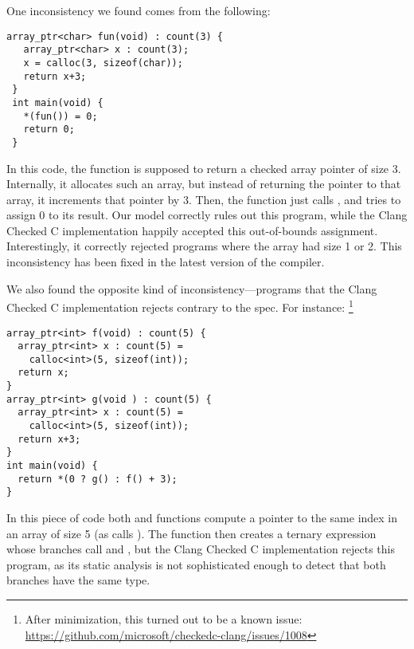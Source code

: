 One inconsistency we found comes from the following:

{\small 
\begin{lstlisting}[xleftmargin=4 mm]
 array_ptr<char> fun(void) : count(3) {
   array_ptr<char> x : count(3);
   x = calloc(3, sizeof(char));
   return x+3;
 }
 int main(void) {
   *(fun()) = 0;
   return 0;
 }
\end{lstlisting}
}%
%
\noindent
In this code, the function  is supposed to return a
checked array pointer of size 3. Internally, it allocates such an
array, but instead of returning the pointer  to that array, it
increments that pointer by 3. Then, the  function just
calls , and tries to assign 0 to its result. Our model
correctly rules out this program, while the Clang Checked C
implementation happily accepted this out-of-bounds
assignment. Interestingly, it correctly rejected programs where the
array had size 1 or 2. This inconsistency has been fixed in the latest
version of the compiler.

We also found the opposite kind of inconsistency---programs that
the Clang Checked C implementation rejects contrary to the spec.
For instance:%
\footnote{After minimization, this turned out to be a known issue: 
  \url{https://github.com/microsoft/checkedc-clang/issues/1008}}

{\small 
\begin{lstlisting}[xleftmargin=4 mm]
array_ptr<int> f(void) : count(5) {
  array_ptr<int> x : count(5) =
    calloc<int>(5, sizeof(int)); 
  return x;
}
array_ptr<int> g(void ) : count(5) {
  array_ptr<int> x : count(5) =
    calloc<int>(5, sizeof(int)); 
  return x+3;
}
int main(void) {
  return *(0 ? g() : f() + 3);
}    
\end{lstlisting}
}%
\noindent
In this piece of code both  and  functions compute a
pointer to the same index in an array of size 5 (as  calls
). The  function then creates a ternary expression
whose branches call  and , but the Clang Checked C
implementation rejects this program, as its static analysis is not
sophisticated enough to detect that both branches have the same type.
% 


